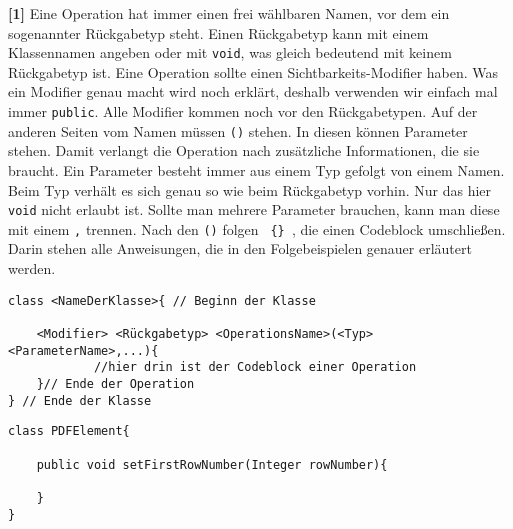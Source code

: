 \begin{enumerate}
          \textbf{[1]} Eine Operation hat immer einen frei wählbaren Namen, vor dem ein sogenannter Rückgabetyp steht.
          Einen Rückgabetyp kann mit einem Klassennamen angeben oder mit \lstinline{void}, was gleich bedeutend mit keinem      Rückgabetyp ist.
          Eine Operation sollte einen Sichtbarkeits-Modifier haben.
          Was ein Modifier genau macht wird noch erklärt, deshalb verwenden wir einfach mal immer \lstinline{public}.
          Alle Modifier kommen noch vor den Rückgabetypen.
          Auf der anderen Seiten vom Namen müssen \lstinline{()} stehen.
          In diesen können Parameter stehen. Damit verlangt die Operation nach zusätzliche Informationen, die sie braucht. Ein Parameter besteht immer aus einem Typ gefolgt von einem Namen.
          Beim Typ verhält es sich genau so wie beim Rückgabetyp vorhin. Nur das hier \lstinline{void} nicht erlaubt ist.
          Sollte man mehrere Parameter brauchen, kann man diese mit einem \lstinline{,} trennen.
          Nach den \lstinline{()} folgen \texttt{ \{\} }, die einen Codeblock umschließen. Darin stehen alle Anweisungen, die in den Folgebeispielen genauer erläutert werden.

          \begin{lstlisting}[title={\textbf{Klassen Syntax}}]
class <NameDerKlasse>{ // Beginn der Klasse

    <Modifier> <Rückgabetyp> <OperationsName>(<Typ> <ParameterName>,...){
            //hier drin ist der Codeblock einer Operation
    }// Ende der Operation
} // Ende der Klasse
                \end{lstlisting}
          \begin{lstlisting}[title={\textbf{Klassenbeispiel}}]
class PDFElement{
        
    public void setFirstRowNumber(Integer rowNumber){
                
    }                    
}
                                    \end{lstlisting}
          


\end{enumerate}
